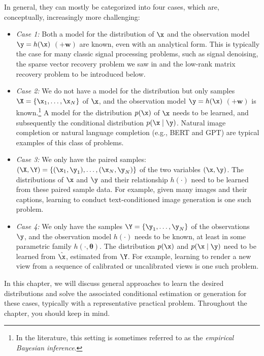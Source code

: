 \documentclass[../../book-main.tex]{subfiles}
\begin{document}
In general, they can mostly be categorized into four cases, which are, conceptually, increasingly more challenging:
\begin{itemize}
\item {\em Case 1:} Both a model for the distribution of $\x$ and the observation model $\y = h(\x)$ $(+ \boldsymbol{w})$ are known, even with an analytical form. This is typically the case for many classic signal processing problems, such as signal denoising, the sparse vector recovery problem we saw in  and the low-rank matrix recovery problem to be introduced below.
\item {\em Case 2:} We do not have a model for the distribution but only samples $\X = \{\x_1, \ldots, \x_N\}$ of $\x$, and the observation model $\y = h(\x)$ $ (+ \boldsymbol{w})$ is known.\footnote{In the literature, this setting is sometimes referred to as the {\em empirical Bayesian inference}.} A model for the distribution $p(\x)$ of $\x$ needs to be learned, and subsequently the conditional distribution $p(\x\mid \y)$. Natural image completion or natural language completion (e.g., BERT and GPT) are typical examples of this class of problems.
\item {\em Case 3:} We only have the paired samples: $(\X, \Y) = \{ (\x_1, \y_1), \ldots, (\x_N, \y_N) \}$ of the two variables  $(\x, \y)$. The distributions of $\x$ and $\y$ and their relationship $h(\cdot)$ need to be learned from these paired sample data. For example, given many images and their captions, learning to conduct text-conditioned image generation is one such problem. 
\item {\em Case 4:} We only have the samples $\Y = \{\y_1, \ldots, \y_N\}$ of the observations $\y$, and the observation model $h(\cdot)$ needs to be known, at least in some parametric family $h(\cdot, \boldsymbol{\theta})$. The distribution $p(\x)$ and $p(\x \mid \y)$ need to be learned from $\hat \x$, estimated from $\Y$. For example, learning to render a new view from a sequence of calibrated or uncalibrated views is one such problem.
\end{itemize}
In this chapter, we will discuss general approaches to learn the desired distributions and solve the associated conditional estimation or generation for these cases, typically with a representative practical problem. Throughout the chapter, you should keep  in mind.
\end{document}
